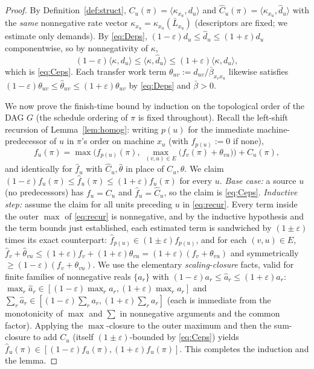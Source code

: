 \documentclass{amsart}
\theoremstyle{definition}
\newcommand{\Chat}{\widehat{C}}
\begin{document}
\begin{proof}
By Definition~\ref{def:struct}, $C_u(\pi)=\langle\kappa_{x_u},d_u\rangle$ and
$\Chat_u(\pi)=\langle\kappa_{x_u},\widehat d_u\rangle$ with the \emph{same}
nonnegative rate vector $\kappa_{x_u}=\kappa_{x_u}(\bar L_{x_u})$ (descriptors
are fixed; we estimate only demands). By \eqref{eq:Deps},
$(1-\varepsilon)d_u\le\widehat d_u\le(1+\varepsilon)d_u$ componentwise, so by
nonnegativity of $\kappa$,
\[
(1-\varepsilon)\langle\kappa,d_u\rangle\le\langle\kappa,\widehat d_u\rangle
\le(1+\varepsilon)\langle\kappa,d_u\rangle,
\]
which is \eqref{eq:Ceps}. Each transfer work term $\theta_{uv}:=d_{uv}/\bar\beta_{x_v x_u}$ likewise
satisfies $(1-\varepsilon)\theta_{uv}\le\widehat\theta_{uv}\le(1+\varepsilon)\theta_{uv}$
by \eqref{eq:Deps} and $\bar\beta>0$.

We now prove the finish-time bound by induction on the topological order of the
DAG $G$ (the schedule ordering of $\pi$ is fixed throughout). Recall the
left-shift recursion of Lemma~\ref{lem:homog}: writing $p(u)$ for the
immediate machine-predecessor of $u$ in $\pi$'s order on machine $x_u$ (with
$f_{p(u)}:=0$ if none),
\begin{equation}\label{eq:recur}
f_u(\pi)=\max\Big(f_{p(u)}(\pi),\ \max_{(v,u)\in E}\big(f_v(\pi)+\theta_{vu}\big)\Big)+C_u(\pi),
\end{equation}
and identically for $\widehat f_u$ with $\widehat C_u,\widehat\theta$ in place of
$C_u,\theta$. We claim $(1-\varepsilon)f_u(\pi)\le\widehat f_u(\pi)\le
(1+\varepsilon)f_u(\pi)$ for every $u$. \emph{Base case:} a source $u$ (no
predecessors) has $f_u=C_u$ and $\widehat f_u=\widehat C_u$, so the claim is
\eqref{eq:Ceps}. \emph{Inductive step:} assume the claim for all units preceding
$u$ in \eqref{eq:recur}. Every term inside the outer $\max$ of \eqref{eq:recur}
is nonnegative, and by the inductive hypothesis and the term bounds just
established, each estimated term is sandwiched by $(1\pm\varepsilon)$ times its
exact counterpart:
$\widehat f_{p(u)}\in(1\pm\varepsilon)f_{p(u)}$, and for each $(v,u)\in E$,
$\widehat f_v+\widehat\theta_{vu}\le(1+\varepsilon)f_v+(1+\varepsilon)\theta_{vu}
=(1+\varepsilon)(f_v+\theta_{vu})$ and symmetrically $\ge(1-\varepsilon)(f_v+\theta_{vu})$.
We use the elementary \emph{scaling-closure} facts, valid for finite families of
nonnegative reals $\{a_r\}$ with $(1-\varepsilon)a_r\le\hat a_r\le(1+\varepsilon)a_r$:
$\max_r\hat a_r\in[(1-\varepsilon)\max_r a_r,(1+\varepsilon)\max_r a_r]$ and
$\sum_r\hat a_r\in[(1-\varepsilon)\sum_r a_r,(1+\varepsilon)\sum_r a_r]$ (each is
immediate from the monotonicity of $\max$ and $\sum$ in nonnegative arguments and
the common factor). Applying the $\max$-closure to the outer maximum and then the
sum-closure to add $C_u$ (itself $(1\pm\varepsilon)$-bounded by \eqref{eq:Ceps})
yields $\widehat f_u(\pi)\in[(1-\varepsilon)f_u(\pi),(1+\varepsilon)f_u(\pi)]$.
This completes the induction and the lemma.
\end{proof}
\end{document}
